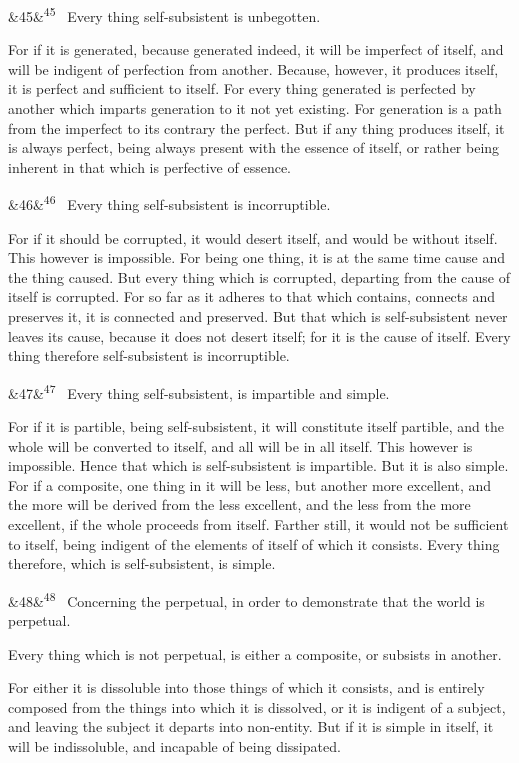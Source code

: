 \documentclass[12pt]{article}
\newcommand{\para}[1][]{\par\noindent\ifx&#1&\else\textsuperscript{\footnotesize #1}~\fi}
\begin{document}
\para[45] Every thing self-subsistent is unbegotten.

For if it is generated, because generated indeed, it will be imperfect of itself, and will be indigent of perfection from another. Because, however, it produces itself, it is perfect and sufficient to itself. For every thing generated is perfected by another which imparts generation to it not yet existing. For generation is a path from the imperfect to its contrary the perfect. But if any thing produces itself, it is always perfect, being always present with the essence of itself, or rather being inherent in that which is perfective of essence.

\para[46] Every thing self-subsistent is incorruptible.

For if it should be corrupted, it would desert itself, and would be without itself. This however is impossible. For being one thing, it is at the same time cause and the thing caused. But every thing which is corrupted, departing from the cause of itself is corrupted. For so far as it adheres to that which contains, connects and preserves it, it is connected and preserved. But that which is self-subsistent never leaves its cause, because it does not desert itself; for it is the cause of itself. Every thing therefore self-subsistent is incorruptible.

\para[47] Every thing self-subsistent, is impartible and simple.

For if it is partible, being self-subsistent, it will constitute itself partible, and the whole will be converted to itself, and all will be in all itself. This however is impossible. Hence that which is self-subsistent is impartible. But it is also simple. For if a composite, one thing in it will be less, but another more excellent, and the more will be derived from the less excellent, and the less from the more excellent, if the whole proceeds from itself. Farther still, it would not be sufficient to itself, being indigent of the elements of itself of which it consists. Every thing therefore, which is self-subsistent, is simple.

\para[48] Concerning the perpetual, in order to demonstrate that the world is perpetual.

Every thing which is not perpetual, is either a composite, or subsists in another.

For either it is dissoluble into those things of which it consists, and is entirely composed from the things into which it is dissolved, or it is indigent of a subject, and leaving the subject it departs into non-entity. But if it is simple in itself, it will be indissoluble, and incapable of being dissipated.
\end{document}
